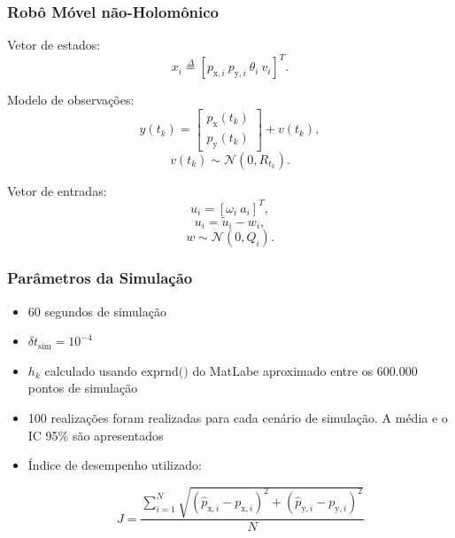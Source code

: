 \documentclass{beamer}
\renewcommand{\(}{\left(}
\renewcommand{\)}{\right)}
\renewcommand{\[}{\left[}
\renewcommand{\]}{\right]}
\begin{document}
\begin{frame}
	\frametitle{Robô Móvel não-Holomônico}
	
	Vetor de estados:
	\begin{equation*}
	x_i \overset{\Delta}{=} [p_{\textrm{x},i}\ p_{\textrm{y},i}\ \theta_i\ v_i]^T.
	\end{equation*}
	
	\vspace{0.25cm}
	Modelo de observações:
	\begin{equation*}
	y(t_k) = 
	\begin{bmatrix}
	p_{\textrm{x}}(t_k) \\
	p_{\textrm{y}}(t_k)
	\end{bmatrix}+v(t_k),
	\end{equation*}
	\begin{equation*}
	v(t_k) \sim \mathcal{N} (0,R_{t_k}).
	\end{equation*}
	
	\vspace{0.25cm}
	Vetor de entradas:
	\begin{equation*}
	u_i = [\omega_i\ a_i]^T,
	\end{equation*}
	\begin{equation*}
	u_i = \tilde{u}_i - w_i,
	\end{equation*}
	\begin{equation*}
	w \sim \mathcal{N} (0, Q_i).
	\end{equation*}


\end{frame}


\begin{frame}
\frametitle{Parâmetros da Simulação}

\begin{itemize}
	\item 60 segundos de simulação
	\vspace{0.25cm}
	\item $\delta t_{\textrm{sim}} = 10^{-4}$
	\vspace{0.25cm}
	\item $h_k$ calculado usando $\textrm{exprnd()}$ do MatLab\texttrademark e aproximado entre os 600.000 pontos de simulação
	\vspace{0.25cm}
	\item 100 realizações foram realizadas para cada cenário de simulação. A média e o IC 95\% são apresentados
	\vspace{0.25cm}
	\item Índice de desempenho utilizado:
	
	\begin{equation*}
	J = \frac{ \sum_{i=1}^N \sqrt{(\hat{p}_{\textrm{x},i}-p_{\textrm{x},i})^2+(\hat{p}_{\textrm{y},i}-p_{\textrm{y},i})^2}}{N}
	\end{equation*}
	
\end{itemize}

\end{frame}
\end{document}
